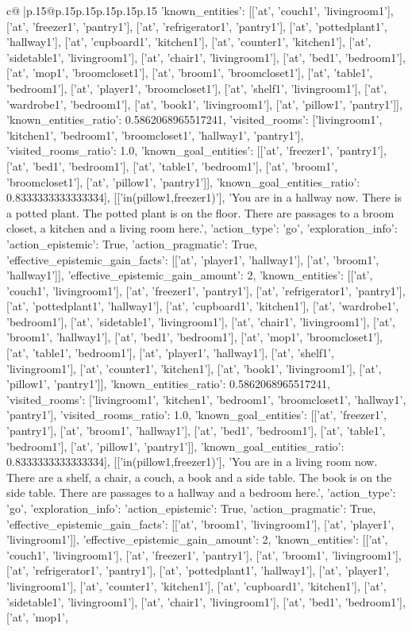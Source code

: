\documentclass{article}
\begin{document}
{\begin{supertabular}{c@{$\;$}|p{.15\linewidth}@{}p{.15\linewidth}p{.15\linewidth}p{.15\linewidth}p{.15\linewidth}p{.15\linewidth}}
{{{'known_entities': [['at', 'couch1', 'livingroom1'], ['at', 'freezer1', 'pantry1'], ['at', 'refrigerator1', 'pantry1'], ['at', 'pottedplant1', 'hallway1'], ['at', 'cupboard1', 'kitchen1'], ['at', 'counter1', 'kitchen1'], ['at', 'sidetable1', 'livingroom1'], ['at', 'chair1', 'livingroom1'], ['at', 'bed1', 'bedroom1'], ['at', 'mop1', 'broomcloset1'], ['at', 'broom1', 'broomcloset1'], ['at', 'table1', 'bedroom1'], ['at', 'player1', 'broomcloset1'], ['at', 'shelf1', 'livingroom1'], ['at', 'wardrobe1', 'bedroom1'], ['at', 'book1', 'livingroom1'], ['at', 'pillow1', 'pantry1']], 'known_entities_ratio': 0.5862068965517241, 'visited_rooms': ['livingroom1', 'kitchen1', 'bedroom1', 'broomcloset1', 'hallway1', 'pantry1'], 'visited_rooms_ratio': 1.0, 'known_goal_entities': [['at', 'freezer1', 'pantry1'], ['at', 'bed1', 'bedroom1'], ['at', 'table1', 'bedroom1'], ['at', 'broom1', 'broomcloset1'], ['at', 'pillow1', 'pantry1']], 'known_goal_entities_ratio': 0.8333333333333334}}], [['in(pillow1,freezer1)'], 'You are in a hallway now. There is a potted plant. The potted plant is on the floor. There are passages to a broom closet, a kitchen and a living room here.', {'action_type': 'go', 'exploration_info': {'action_epistemic': True, 'action_pragmatic': True, 'effective_epistemic_gain_facts': [['at', 'player1', 'hallway1'], ['at', 'broom1', 'hallway1']], 'effective_epistemic_gain_amount': 2, 'known_entities': [['at', 'couch1', 'livingroom1'], ['at', 'freezer1', 'pantry1'], ['at', 'refrigerator1', 'pantry1'], ['at', 'pottedplant1', 'hallway1'], ['at', 'cupboard1', 'kitchen1'], ['at', 'wardrobe1', 'bedroom1'], ['at', 'sidetable1', 'livingroom1'], ['at', 'chair1', 'livingroom1'], ['at', 'broom1', 'hallway1'], ['at', 'bed1', 'bedroom1'], ['at', 'mop1', 'broomcloset1'], ['at', 'table1', 'bedroom1'], ['at', 'player1', 'hallway1'], ['at', 'shelf1', 'livingroom1'], ['at', 'counter1', 'kitchen1'], ['at', 'book1', 'livingroom1'], ['at', 'pillow1', 'pantry1']], 'known_entities_ratio': 0.5862068965517241, 'visited_rooms': ['livingroom1', 'kitchen1', 'bedroom1', 'broomcloset1', 'hallway1', 'pantry1'], 'visited_rooms_ratio': 1.0, 'known_goal_entities': [['at', 'freezer1', 'pantry1'], ['at', 'broom1', 'hallway1'], ['at', 'bed1', 'bedroom1'], ['at', 'table1', 'bedroom1'], ['at', 'pillow1', 'pantry1']], 'known_goal_entities_ratio': 0.8333333333333334}}], [['in(pillow1,freezer1)'], 'You are in a living room now. There are a shelf, a chair, a couch, a book and a side table. The book is on the side table. There are passages to a hallway and a bedroom here.', {'action_type': 'go', 'exploration_info': {'action_epistemic': True, 'action_pragmatic': True, 'effective_epistemic_gain_facts': [['at', 'broom1', 'livingroom1'], ['at', 'player1', 'livingroom1']], 'effective_epistemic_gain_amount': 2, 'known_entities': [['at', 'couch1', 'livingroom1'], ['at', 'freezer1', 'pantry1'], ['at', 'broom1', 'livingroom1'], ['at', 'refrigerator1', 'pantry1'], ['at', 'pottedplant1', 'hallway1'], ['at', 'player1', 'livingroom1'], ['at', 'counter1', 'kitchen1'], ['at', 'cupboard1', 'kitchen1'], ['at', 'sidetable1', 'livingroom1'], ['at', 'chair1', 'livingroom1'], ['at', 'bed1', 'bedroom1'], ['at', 'mop1', }}}
\end{supertabular}}
\end{document}
